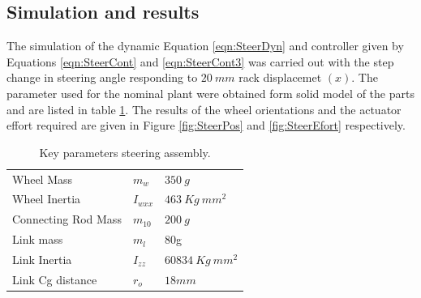 {\subsection{Simulation and results}
The simulation of the  dynamic Equation \ref{eqn:SteerDyn} and controller given by Equations \ref{eqn:SteerCont} and \ref{eqn:SteerCont3} was carried out with the step change in steering angle responding to $ 20~mm$  rack displacemet $(x)$.  The parameter used for the nominal plant were obtained form solid model of the parts and are listed in table \ref{tb:steerPara}. The results of the wheel orientations and the actuator effort required are given in Figure \ref{fig:SteerPos} and \ref{fig:SteerEfort} respectively.

\begin{table}[!htbp]
	\caption{Key parameters steering assembly.}
	\label{tb:steerPara}
	\centering
	\begin{tabular}{l l l }
		\hline
		
		Wheel Mass& $m_w $ &$ 350~g$  \\ 
		Wheel Inertia & $I_{wxx}$ & $463~ Kg ~mm^2$\\
		Connecting Rod Mass & $m_{10} $& $200~g$ \\
		Link mass& $m_l$ & 80g\\
		Link Inertia & $I_{zz} $& $60834~Kg ~mm^2$\\
		Link Cg distance & $r_o$ & $18mm$\\
		\hline
	\end{tabular}
\end{table}

}
